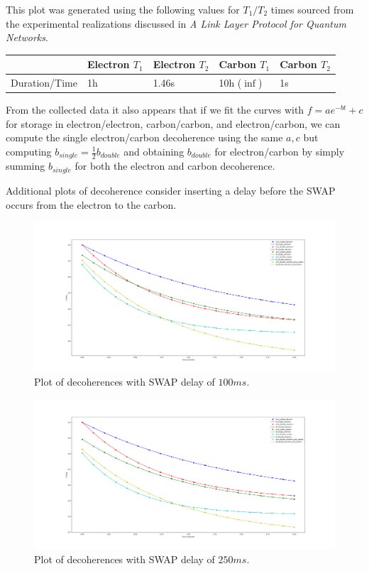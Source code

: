 \documentclass{article}
\begin{document}
This plot was generated using the following values for $T_1/T_2$ times sourced from the experimental realizations discussed in \emph{A Link Layer Protocol for Quantum Networks}.

\begin{table}[!htb]
\begin{tabular}{|l|l|l|l|l|}
\hline
              & Electron $T_1$ & Electron $T_2$ & Carbon $T_1$ & Carbon $T_2$ \\
\hline
Duration/Time & 1h            & 1.46s       & 10h ($\inf$) & 1s          \\
\hline
\end{tabular}
\end{table}

From the collected data it also appears that if we fit the curves with $f=ae^{-bt}+c$ for storage in electron/electron, carbon/carbon, and electron/carbon, we can compute the single electron/carbon decoherence using the same $a,c$ but computing $b_{single}=
\frac{1}{2}b_{double}$ and obtaining $b_{double}$ for electron/carbon by simply summing $b_{single}$ for both the electron and carbon decoherence.

Additional plots of decoherence consider inserting a delay before the SWAP occurs from the electron to the carbon.
\begin{figure}[!htb]
    \centering
    \includegraphics[width=\textwidth]{figures/decoherence_swap_delay_100ms.png}
    \caption{Plot of decoherences with SWAP delay of $100ms$.}
    \label{fig:decoherence_100_delay}
\end{figure}

\begin{figure}[!htb]
    \centering
    \includegraphics[width=\textwidth]{figures/decoherence_swap_delay_250ms.png}
    \caption{Plot of decoherences with SWAP delay of $250ms$.}
    \label{fig:decoherence_250_delay}
\end{figure}
\end{document}
